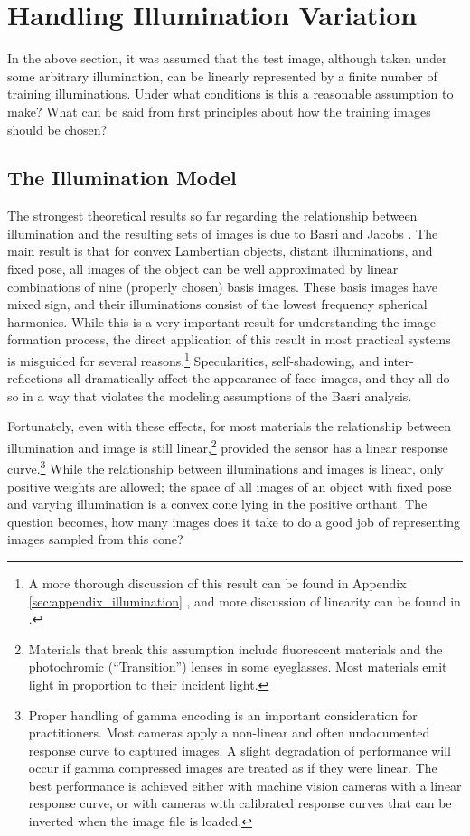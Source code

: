 \section{Handling Illumination Variation}\label{sec:illumination}
In the above section, it was assumed that the test image, although taken under
some arbitrary illumination, can be linearly represented by a finite number of
training illuminations.  Under what conditions is this a reasonable assumption
to make?  What can be said from first principles about how the training images
should be chosen?

\subsection{The Illumination Model}
%
The strongest theoretical results so far regarding the relationship between
illumination and the resulting sets of images is due to Basri and Jacobs
\cite{Basri2003-PAMI}.  The main result is that for convex Lambertian objects,
distant illuminations, and fixed pose, all images of the object can be well
approximated by linear combinations of nine (properly chosen) basis images.
These basis images have mixed sign, and their illuminations consist of the
lowest frequency spherical harmonics.  While this is a very important result
for understanding the image formation process, the direct application of this
result in most practical systems is misguided for several reasons.\footnote{A more
thorough discussion of this result can be found in 
Appendix \ref{sec:appendix_illumination}
, and more discussion of linearity can be found in
\cite{belhumeur1998set}.}
Specularities, self-shadowing, and
inter-reflections all dramatically affect the appearance of face images, and
they all do so in a way that violates the modeling assumptions of the Basri
analysis.

Fortunately, even with these effects, for most materials the relationship
between illumination and image is still linear,\footnote{Materials that break
this assumption include fluorescent materials and the photochromic
(``Transition'') lenses in some eyeglasses.  Most materials emit light in
proportion to their incident light.} provided the sensor has a linear response
curve.\footnote{Proper handling of gamma encoding is an important consideration
for practitioners.  Most cameras apply a non-linear and often undocumented
response curve to captured images.  A slight degradation of performance will
occur if gamma compressed images are treated as if they were linear.  The best
performance is achieved either with machine vision cameras with a linear
response curve, or with cameras with calibrated response curves that can be
inverted when the image file is loaded.} While the relationship between
illuminations and images is linear, only positive weights are allowed; the
space of all images of an object with fixed pose and varying illumination is a
convex cone lying in the positive orthant. The question becomes, how many
images does it take to do a good job of representing images sampled from this
cone?

